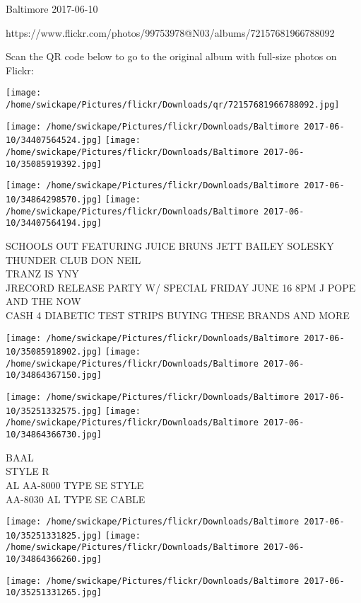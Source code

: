 \documentclass[10pt,letterpaper]{article}
\begin{document}
Baltimore 2017-06-10

https://www.flickr.com/photos/99753978@N03/albums/72157681966788092

Scan the QR code below to go to the original album with full-size photos on Flickr:

\texttt{[image: /home/swickape/Pictures/flickr/Downloads/qr/72157681966788092.jpg]}
\pagebreak

\texttt{[image: /home/swickape/Pictures/flickr/Downloads/Baltimore 2017-06-10/34407564524.jpg]}
\texttt{[image: /home/swickape/Pictures/flickr/Downloads/Baltimore 2017-06-10/35085919392.jpg]}

\texttt{[image: /home/swickape/Pictures/flickr/Downloads/Baltimore 2017-06-10/34864298570.jpg]}
\texttt{[image: /home/swickape/Pictures/flickr/Downloads/Baltimore 2017-06-10/34407564194.jpg]}

SCHOOLS OUT FEATURING JUICE BRUNS JETT BAILEY SOLESKY THUNDER CLUB DON NEIL\\
TRANZ IS YNY\\
JRECORD RELEASE PARTY W/ SPECIAL FRIDAY JUNE 16 8PM J POPE AND THE NOW\\
CASH 4 DIABETIC TEST STRIPS BUYING THESE BRANDS AND MORE
\pagebreak

\texttt{[image: /home/swickape/Pictures/flickr/Downloads/Baltimore 2017-06-10/35085918902.jpg]}
\texttt{[image: /home/swickape/Pictures/flickr/Downloads/Baltimore 2017-06-10/34864367150.jpg]}

\texttt{[image: /home/swickape/Pictures/flickr/Downloads/Baltimore 2017-06-10/35251332575.jpg]}
\texttt{[image: /home/swickape/Pictures/flickr/Downloads/Baltimore 2017-06-10/34864366730.jpg]}

BAAL\\
STYLE R\\
AL AA{-}8000 TYPE SE STYLE\\
AA{-}8030 AL TYPE SE CABLE
\pagebreak

\texttt{[image: /home/swickape/Pictures/flickr/Downloads/Baltimore 2017-06-10/35251331825.jpg]}
\texttt{[image: /home/swickape/Pictures/flickr/Downloads/Baltimore 2017-06-10/34864366260.jpg]}

\vspace{0.25in}
\texttt{[image: /home/swickape/Pictures/flickr/Downloads/Baltimore 2017-06-10/35251331265.jpg]}
\end{document}
